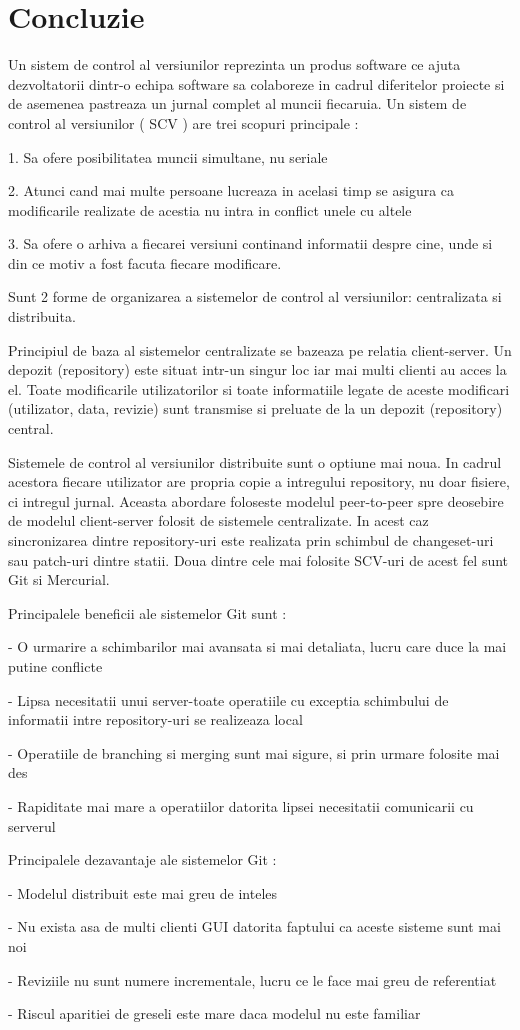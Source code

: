 
\section*{Concluzie}

Un sistem de control al versiunilor reprezinta un produs software ce ajuta dezvoltatorii dintr-o echipa software sa colaboreze in cadrul diferitelor proiecte si de asemenea pastreaza un jurnal complet al muncii fiecaruia. 
Un sistem de control al versiunilor ( SCV ) are trei scopuri principale : 

1. Sa ofere posibilitatea muncii simultane, nu seriale   

2. Atunci cand mai multe persoane lucreaza in acelasi timp se asigura ca modificarile realizate de acestia nu intra in conflict unele cu altele 

3. Sa ofere o arhiva a fiecarei versiuni continand informatii despre cine, unde si din ce motiv a fost facuta fiecare modificare.  

Sunt 2 forme de organizarea a sistemelor de control al versiunilor: centralizata si distribuita.

Principiul de baza al sistemelor centralizate se bazeaza pe relatia client-server. Un depozit (repository) este situat intr-un singur loc iar mai multi clienti au acces la el. Toate modificarile utilizatorilor si toate informatiile legate de aceste modificari (utilizator, data, revizie) sunt transmise si preluate de la un depozit (repository) central.


Sistemele de control al versiunilor distribuite sunt o optiune mai noua. In cadrul acestora fiecare utilizator are propria copie a intregului repository, nu doar fisiere, ci intregul jurnal. Aceasta abordare foloseste modelul peer-to-peer spre deosebire de modelul client-server folosit de sistemele centralizate. In acest caz sincronizarea dintre repository-uri este realizata prin schimbul de changeset-uri sau patch-uri dintre statii. Doua dintre cele mai folosite SCV-uri de acest fel sunt Git si Mercurial. 

Principalele beneficii ale sistemelor Git sunt : 

- O urmarire a schimbarilor mai avansata si mai detaliata, lucru care duce la mai putine conflicte

- Lipsa necesitatii unui server-toate operatiile cu exceptia schimbului de informatii intre repository-uri se realizeaza local 

- Operatiile de branching si merging sunt mai sigure, si prin urmare folosite mai des 

- Rapiditate mai mare a operatiilor datorita lipsei necesitatii comunicarii cu serverul 

Principalele dezavantaje ale sistemelor Git :
 
- Modelul distribuit este mai greu de inteles 

- Nu exista asa de multi clienti GUI datorita faptului ca aceste sisteme sunt mai noi 

- Reviziile nu sunt numere incrementale, lucru ce le face mai greu de referentiat 

- Riscul aparitiei de greseli este mare daca modelul nu este familiar


\clearpage

      
